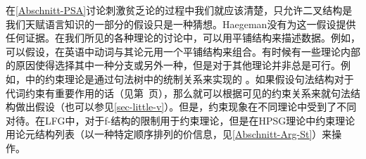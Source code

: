 在\ref{Abschnitt-PSA}讨论刺激贫乏论的过程中我们就应该清楚，只允许二叉结构是我们天赋语言知识的一部分的假设只是一种猜想。Haegeman没有为这一假设提供任何证据。在我们所见的各种理论的讨论中，可以用平铺结构来描述数据。例如，可以假设，在英语中动词与其论元用一个平铺结构来组合\citep[]{ps2}。有时候有一些理论内部的原因使得选择其中一种分支或另外一种，但是对于其他理论并非总是可行。例如，\gbtc 中的约束理论是通过句法树中的统制关系来实现的 \citep[]{Chomsky81a}。如果假设句法结构对于代词约束有重要作用的话（见第~\pageref{Seite-Bindungstheorie}页），那么就可以根据可见的约束关系来就句法结构做出假设（也可以参见\ref{sec-little-v}）。但是，约束现象在不同理论中受到了不同对待。在LFG\indexlfg 中，对于f-结构的限制用于约束理论\citep{Dalrymple93a}，但是在HPSG\indexhpsg 理论中约束理论用论元结构列表（以一种特定顺序排列的价信息，见\ref{Abschnitt-Arg-St}）来操作。
 
